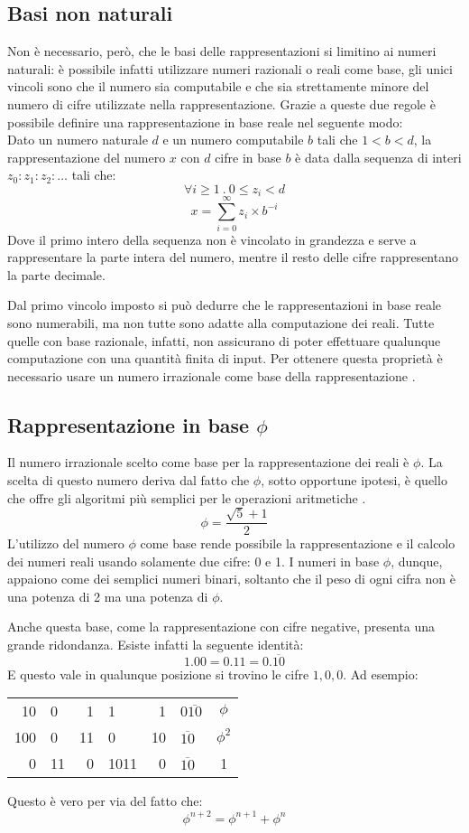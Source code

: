\documentclass[Lau,oneside]{sapthesis}
\begin{document}
\subsection{Basi non naturali}\label{basi-non-naturali}
Non è necessario, però, che le basi delle rappresentazioni si limitino ai numeri naturali: è possibile infatti utilizzare numeri razionali o reali come base, gli unici vincoli sono che il numero sia computabile e che sia strettamente minore del numero di cifre utilizzate nella rappresentazione. Grazie a queste due regole è possibile definire una rappresentazione in base reale nel seguente modo:\\
Dato un numero naturale $d$ e un numero computabile $b$ tali che $1<b<d$, la rappresentazione del numero $x$ con $d$ cifre in base $b$ è data dalla sequenza di interi $z_0:z_1:z_2:\ldots$ tali che:
$$\forall i \geq 1 \ . \ 0\leq z_i < d$$
$$x=\sum_{i=0}^\infty z_i \times b^{-i}$$
Dove il primo intero della sequenza non è vincolato in grandezza e serve a rappresentare la parte intera del numero, mentre il resto delle cifre rappresentano la parte decimale.

Dal primo vincolo imposto si può dedurre che le rappresentazioni in base reale sono numerabili, ma non tutte sono adatte alla computazione dei reali. Tutte quelle con base razionale, infatti, non assicurano di poter effettuare qualunque computazione con una quantità finita di input. Per ottenere questa proprietà è necessario usare un numero irrazionale come base della rappresentazione \cite{PietroDiGianantonio}.


\subsection{Rappresentazione in base $\phi$}\label{rappresentazione-phi}
Il numero irrazionale scelto come base per la rappresentazione dei reali è $\phi$. La scelta di questo numero deriva dal fatto che $\phi$, sotto opportune ipotesi, è quello che offre gli algoritmi più semplici per le operazioni aritmetiche \cite{PietroDiGianantonio}.
$$\phi = \frac{\sqrt{5}+1}{2}$$
L'utilizzo del numero $\phi$ come base rende possibile la rappresentazione e il calcolo dei numeri reali usando solamente due cifre: 0 e 1. I numeri in base $\phi$, dunque, appaiono come dei semplici numeri binari, soltanto che il peso di ogni cifra non è una potenza di 2 ma una potenza di $\phi$.

Anche questa base, come la rappresentazione con cifre negative, presenta una grande ridondanza. Esiste infatti la seguente identità:
$$1.00 = 0.11 = 0.\overline{10}$$
E questo vale in qualunque posizione si trovino le cifre $1,0,0$. Ad esempio:
\begin{center}
\begin{tabular}{r@{.}l@{ = }r@{.}l@{ = }r@{.}l@{ = }c}
10  & 0 & 1  & 1 & 1  & 0$\overline{10}$ & $\phi$\\
100 & 0 & 11 & 0 & 10 &  $\overline{10}$ & $\phi^2$\\
0 & 11 & 0 & 1011 & 0 & $\overline{10}$ & 1
\end{tabular}
\end{center}
Questo è vero per via del fatto che:
$$\phi^{n+2} = \phi^{n+1} + \phi^n$$
\end{document}
